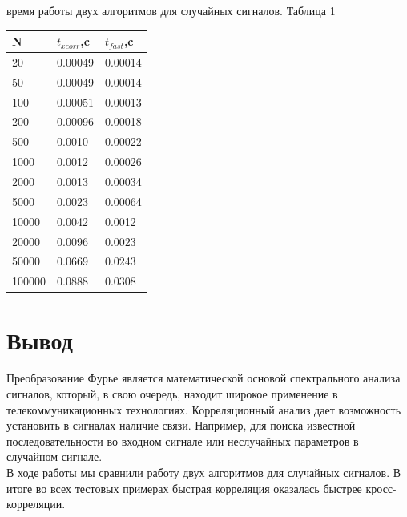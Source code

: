\documentclass[a4paper,12pt]{article}
\begin{document}
\begin{enumerate}
{ время работы двух алгоритмов для случайных сигналов.
\flushright Таблица 1
\begin{center}
	\begin{tabular}{|p{3cm}|p{3cm}|p{3cm}|}
		\hline N&$t_{xcorr}$,c&$t_{fast}$,c \\
		\hline 20&0.00049&0.00014 \\
		\hline 50&0.00049&0.00014 \\
		\hline 100&0.00051&0.00013 \\
		\hline 200&0.00096&0.00018 \\
		\hline 500&0.0010&0.00022 \\
		\hline 1000&0.0012&0.00026 \\
		\hline 2000&0.0013&0.00034 \\
		\hline 5000&0.0023&0.00064\\
		\hline 10000&0.0042&0.0012 \\
		\hline 20000&0.0096&0.0023 \\
		\hline 50000&0.0669&0.0243 \\
		\hline 100000&0.0888&0.0308 \\
		\hline 
	\end{tabular}
\end{center}}

\section{Вывод}

Преобразование Фурье является математической основой спектрального анализа сигналов, который, в свою очередь, находит широкое применение в телекоммуникационных технологиях. Корреляционный анализ дает возможность установить в сигналах наличие связи. Например, для поиска известной последовательности во входном сигнале или неслучайных параметров в случайном сигнале.\\
В ходе работы мы сравнили работу двух алгоритмов для случайных сигналов. В итоге во всех тестовых примерах быстрая корреляция оказалась быстрее кросс-корреляции.

\end{enumerate}
\end{document}
